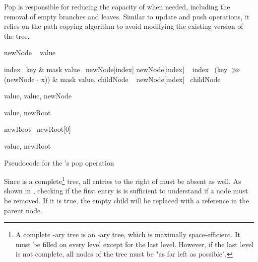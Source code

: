 Pop is responsible for reducing the capacity of \treerb{} when needed, including the removal of empty branches and leaves. Similar to update and push operations, it relies on the path copying algorithm to avoid modifying the existing version of the tree.

\begin{listing}[ht!]

    \begin{algorithmic}[1]
            \State newNode \la\ 
            \State value \la\ \nil{}

                \State index \la\ key \& mask
                \State value \la\ newNode[index]
                \State newNode[index] \la\ \nil{}
            \Else
                \State index \la\ (key $\ggg$ (newNode $\cdot$ x)) \& mask
                \State value, childNode \la\ 
                \State newNode[index] \la\ childNode
            \EndIf

                \State \Return value, \nil{}
            \Else
                \State \Return value, newNode
            \EndIf
        \EndFunction

        \State

            \State value, newRoot \la\ 

                \State newRoot \la\ newRoot[0]
            \EndIf

            \State \Return value, newRoot
        \EndFunction
    \end{algorithmic}

    \caption{Pseudocode for the \treerb{}'s pop operation}
    \label{lst:rb-tree-pop}
\end{listing}

Since \treerb{} is a complete\footnote{A complete \m{}-ary tree is an \m{}-ary tree, which is maximally space-efficient. It must be filled on every level except for the last level. However, if the last level is not complete, all nodes of the tree must be "as far left as possible".} tree, all entries to the right of \nil{} must be absent as well. As shown in , checking if the first entry is \nil{} is sufficient to understand if a node must be removed. If it is true, the empty child will be replaced with a \nil{} reference in the parent node.

